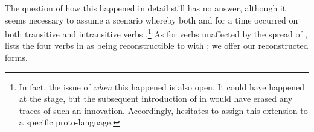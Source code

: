 %
%
The question of how this happened in detail \parencite[107--112]{meira1998proto} still has no answer, although it seems necessary to assume a scenario whereby both  and  for a time occurred on both transitive and intransitive verbs \parencite[112]{meira1998proto}.\footnote{In fact, the issue of \emph{when} this happened is also open. It could have happened at the \PTar stage, but the subsequent introduction of  in \carijo {} would have erased any traces of such an innovation. Accordingly, \textcite{meira1998proto} hesitates to assign this extension to a specific proto-language.}
As for verbs unaffected by the spread of , \textcite{meira1998proto} lists the four verbs in  as being reconstructible to \PTar with ; we offer our reconstructed \PTir forms.

